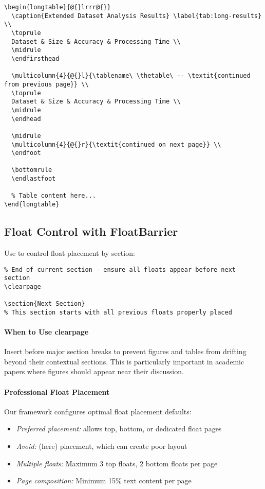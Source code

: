 \documentclass[11pt]{article}
\begin{document}
\begin{verbatim}
\begin{longtable}{@{}lrrr@{}}
  \caption{Extended Dataset Analysis Results} \label{tab:long-results} \\
  \toprule
  Dataset & Size & Accuracy & Processing Time \\
  \midrule
  \endfirsthead
  
  \multicolumn{4}{@{}l}{\tablename\ \thetable\ -- \textit{continued from previous page}} \\
  \toprule
  Dataset & Size & Accuracy & Processing Time \\
  \midrule
  \endhead
  
  \midrule
  \multicolumn{4}{@{}r}{\textit{continued on next page}} \\
  \endfoot
  
  \bottomrule
  \endlastfoot
  
  % Table content here...
\end{longtable}
\end{verbatim}

\subsection{Float Control with FloatBarrier}

Use  to control float placement by section:

\begin{verbatim}
% End of current section - ensure all floats appear before next section
\clearpage

\section{Next Section}
% This section starts with all previous floats properly placed
\end{verbatim}

\paragraph{When to Use clearpage} Insert  before major section breaks to prevent figures and tables from drifting beyond their contextual sections. This is particularly important in academic papers where figures should appear near their discussion.

\paragraph{Professional Float Placement} Our framework configures optimal float placement defaults:
\begin{itemize}
\item \emph{Preferred placement:} \code{[tbp]} allows top, bottom, or dedicated float pages
\item \emph{Avoid:} \code{[h]} (here) placement, which can create poor layout
\item \emph{Multiple floats:} Maximum 3 top floats, 2 bottom floats per page
\item \emph{Page composition:} Minimum 15\% text content per page
\end{itemize}
\end{document}
